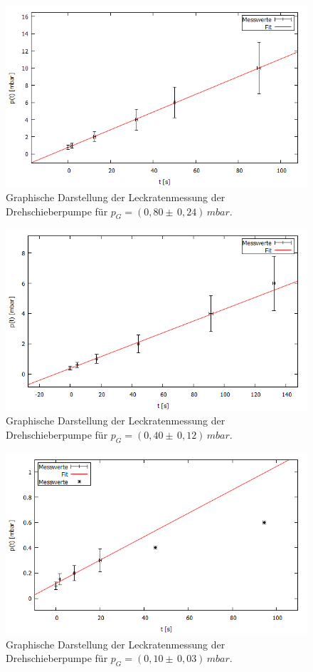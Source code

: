 \begin{figure}[H]
  \centering
  \includegraphics[width=14cm]{bilder/leckdrehfit2.png}
	\caption{Graphische Darstellung der Leckratenmessung der Drehschieberpumpe für $p_G=(0,80 \pm \, 0,24) \, \si{mbar}$.}
  \label{leckdreh2}
\end{figure}
\begin{figure}[H]
  \centering
  \includegraphics[width=14cm]{bilder/leckdrehfit3.png}
	\caption{Graphische Darstellung der Leckratenmessung der Drehschieberpumpe für $p_G=(0,40 \pm \, 0,12) \, \si{mbar}$.}
  \label{leckdreh3}
\end{figure}
\begin{figure}[H]
  \centering
  \includegraphics[width=14cm]{bilder/leckdrehfit4.png}
	\caption{Graphische Darstellung der Leckratenmessung der Drehschieberpumpe für $p_G=(0,10 \pm \, 0,03) \, \si{mbar}$.}
  \label{leckdreh4}
\end{figure}\clearpage
